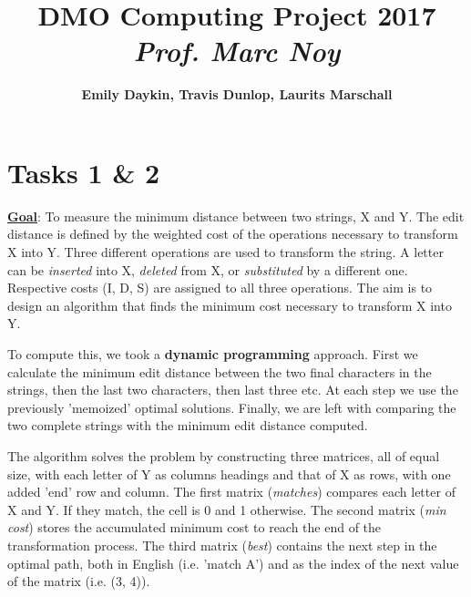 \documentclass{article}
\title{
\vspace{2in}
\textmd{\textbf{DMO Computing Project 2017}}\\
\vspace{0.1in}\large{\textit{Prof. Marc Noy}}
\vspace{3in}
}
\author{\textbf{Emily Daykin, Travis Dunlop, Laurits Marschall}}
\begin{document}
\clearpage\maketitle
\thispagestyle{empty}



\newpage
\setcounter{page}{1}



\section*{Tasks 1 \& 2}

\textbf{\underline{Goal}}: To measure the minimum distance between two strings, X and Y. The edit distance is defined by the weighted  cost of the operations necessary to transform X into Y. Three different operations are used to transform the string. A letter can be \textit{inserted} into X, \textit{deleted} from X, or \textit{substituted} by a different one. Respective costs (I, D, S) are assigned to all three operations. The aim is to design an algorithm that finds the minimum cost necessary to transform X into Y. 

\qquad To compute this, we took a \textbf{dynamic programming} approach.  First we calculate the minimum edit distance between the two final characters in the strings, then the last two characters, then last three etc. At each step we use the previously 'memoized' optimal solutions.  Finally, we are left with comparing the two complete strings with the minimum edit distance computed.

\qquad The algorithm solves the problem by constructing three matrices, all of equal size, with each letter of Y as columns headings and that of X as rows, with one added 'end' row and column. The first matrix (\textit{matches}) compares each letter of X and Y. If they match, the cell is 0 and 1 otherwise.  The second matrix (\textit{min cost}) stores the accumulated minimum cost to reach the end of the transformation process. The third matrix (\textit{best}) contains the next step in the optimal path, both in English (i.e. 'match A') and as the index of the next value of the matrix (i.e. (3, 4)).
\end{document}
